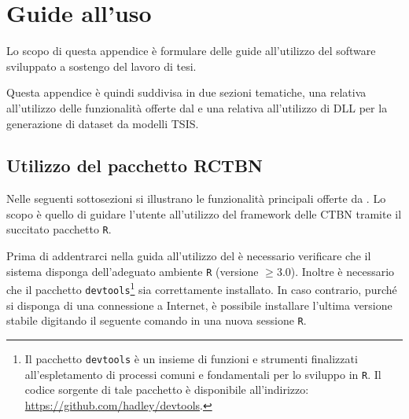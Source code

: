 
\chapter{Guide all'uso}
\label{cap:guide}
Lo scopo di questa appendice è formulare delle guide all'utilizzo del software sviluppato a sostengo del lavoro di tesi.

Questa appendice è quindi suddivisa in due sezioni tematiche, una relativa all'utilizzo delle funzionalità offerte dal \pacchettor{} e una relativa all'utilizzo di  \acs{DLL} per la generazione di dataset da modelli \acs{TSIS}.

\section{Utilizzo del pacchetto RCTBN}\label{sec:package-howto}
Nelle seguenti sottosezioni si illustrano le funzionalità principali offerte da \rctbn{}. Lo scopo è quello di guidare l'utente all'utilizzo del framework delle \acs{CTBN} tramite il succitato pacchetto \lstinline[]|R|.

Prima di addentrarci nella guida all'utilizzo del \pacchettor{} è necessario verificare che il sistema disponga dell'adeguato ambiente \lstinline[]|R| (versione $\ge 3.0$). Inoltre è necessario che il pacchetto \lstinline[]|devtools|\footnote{Il pacchetto \lstinline[]|devtools| è un insieme di funzioni e strumenti finalizzati all'espletamento di processi comuni e fondamentali per lo sviluppo in \lstinline[]|R|. Il codice sorgente di tale pacchetto è disponibile all'indirizzo: \url{https://github.com/hadley/devtools}.} sia correttamente installato. In caso contrario, purché si disponga di una connessione a Internet, è possibile installare l'ultima versione stabile digitando il seguente comando in una nuova sessione \lstinline[]|R|.

\vspace*{8pt}

